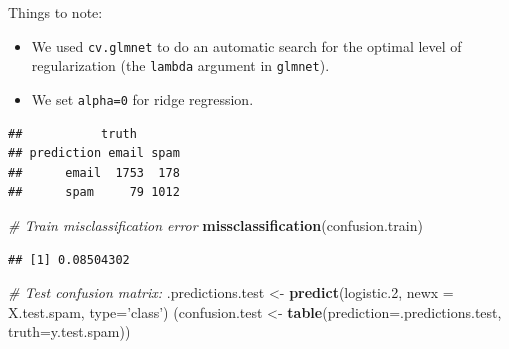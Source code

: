 \documentclass[]{book}
\newenvironment{Shaded}{\begin{snugshade}}{\end{snugshade}}
\newcommand{\KeywordTok}[1]{\textcolor[rgb]{0.13,0.29,0.53}{\textbf{{#1}}}}
\newcommand{\DataTypeTok}[1]{\textcolor[rgb]{0.13,0.29,0.53}{{#1}}}
\newcommand{\FloatTok}[1]{\textcolor[rgb]{0.00,0.00,0.81}{{#1}}}
\newcommand{\StringTok}[1]{\textcolor[rgb]{0.31,0.60,0.02}{{#1}}}
\newcommand{\CommentTok}[1]{\textcolor[rgb]{0.56,0.35,0.01}{\textit{{#1}}}}
\newcommand{\NormalTok}[1]{{#1}}
\providecommand{\tightlist}{%
  \setlength{\itemsep}{0pt}\setlength{\parskip}{0pt}}
\theoremstyle{definition}
\theoremstyle{definition}
\theoremstyle{remark}
\begin{document}
Things to note:

\begin{itemize}
\tightlist
\item
  We used \texttt{cv.glmnet} to do an automatic search for the optimal
  level of regularization (the \texttt{lambda} argument in
  \texttt{glmnet}).
\item
  We set \texttt{alpha=0} for ridge regression.
\end{itemize}

\begin{Shaded}
\end{Shaded}

\begin{verbatim}
##           truth
## prediction email spam
##      email  1753  178
##      spam     79 1012
\end{verbatim}

\begin{Shaded}
\begin{Highlighting}[]
\CommentTok{# Train misclassification error}
\KeywordTok{missclassification}\NormalTok{(confusion.train)}
\end{Highlighting}
\end{Shaded}

\begin{verbatim}
## [1] 0.08504302
\end{verbatim}

\begin{Shaded}
\begin{Highlighting}[]
\CommentTok{# Test confusion matrix:}
\NormalTok{.predictions.test <-}\StringTok{ }\KeywordTok{predict}\NormalTok{(logistic}\FloatTok{.2}\NormalTok{, }\DataTypeTok{newx =} \NormalTok{X.test.spam, }\DataTypeTok{type=}\StringTok{'class'}\NormalTok{) }
\NormalTok{(confusion.test <-}\StringTok{ }\KeywordTok{table}\NormalTok{(}\DataTypeTok{prediction=}\NormalTok{.predictions.test, }\DataTypeTok{truth=}\NormalTok{y.test.spam))}
\end{Highlighting}
\end{Shaded}
\end{document}
